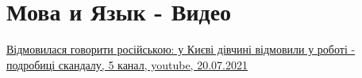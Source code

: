  
 
 
 
 
\section{Мова и Язык - Видео}

\href{https://www.youtube.com/watch?v=swb22_gGNMo}{%
Відмовилася говорити російською: у Києві дівчині відмовили у роботі - подробиці скандалу,%
5 канал, youtube, 20.07.2021%
}
